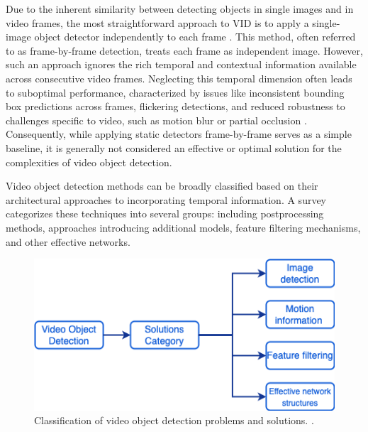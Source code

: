 Due to the inherent similarity between detecting objects in single images and in video frames, the most straightforward approach to VID is to apply a single-image object detector independently to each frame \cite{placeholder_static_detector_for_vid}. This method, often referred to as frame-by-frame detection, treats each frame as independent image. However, such an approach ignores the rich temporal and contextual information available across consecutive video frames. Neglecting this temporal dimension often leads to suboptimal performance, characterized by issues like inconsistent bounding box predictions across frames, flickering detections, and reduced robustness to challenges specific to video, such as motion blur or partial occlusion \cite{placeholder_vid_limitations_survey}. Consequently, while applying static detectors frame-by-frame serves as a simple baseline, it is generally not considered an effective or optimal solution for the complexities of video object detection.


Video object detection methods can be broadly classified based on their architectural approaches to incorporating temporal information. A survey \cite{jiaoNewGenerationDeep2022} categorizes these techniques into several groups: including postprocessing methods, approaches introducing additional models, feature filtering mechanisms, and other effective networks.

\begin{figure}
    \centering
    \includegraphics[width=\textwidth]{figures/figure_background_vod_classification.png}
    \caption{Classification of video object detection problems and solutions. \cite{jiaoNewGenerationDeep2022}.}
    \label{fig:figure_background_vod_classification}
\end{figure}


